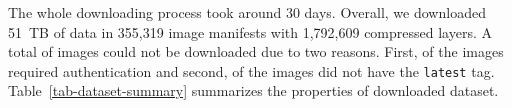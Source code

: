 %
%


The whole downloading process took around 30 days.
%
Overall, we downloaded 51~TB of data in 355,319 image manifests with 1,792,609
compressed layers.
%
A total of \gap images could not be downloaded due to two reasons.
%
First, \gap of the images required authentication and
second, \gap of the images did not have the \texttt{latest} tag.
%
Table~\ref{tab-dataset-summary} summarizes the properties of downloaded
dataset.







%
%

